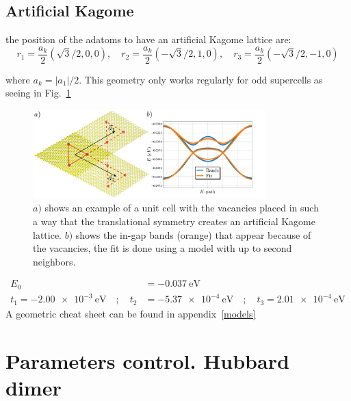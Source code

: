 \subsection{Artificial Kagome}
the position of the adatoms to have an artificial Kagome lattice are:
\begin{equation}
  r_1 = \frac{a_k}{2}\left(\sqrt{3}/2,  0 ,0\right),\quad
  r_2 = \frac{a_k}{2}\left(-\sqrt{3}/2,1,0\right),\quad
  r_3 = \frac{a_k}{2}\left(-\sqrt{3}/2,-1,0\right)
\end{equation}

where $a_k = |a_1|/2$. This geometry only works regularly for odd supercells as seeing in Fig.~\ref{kagome}


\begin{figure}[h!]
  \centering
  \includegraphics[width=0.8\textwidth]{artlat/fig/kagome_bands.pdf}
  \vspace{-5pt}
  \caption{$a)$ shows an example of a unit cell with the vacancies placed in such a way that the translational symmetry creates an artificial Kagome lattice. $b)$ shows the in-gap bands (orange) that appear because of the vacancies, the fit is done using a model with up to second neighbors.}
  \label{kagome}
\end{figure}
\FloatBarrier
\begin{equation}
\begin{split}
  E_0 &= \SI{-0.037}{\eV}\\
  t_1 = \SI{-2.00e-3}{\eV} \quad;\quad
  t_2 &= \SI{-5.37e-4}{\eV} \quad;\quad
  t_3 = \SI{2.01e-4}{\eV}
\end{split}
\end{equation}
A geometric cheat sheet can be found in appendix~\ref{models}





\section{Parameters control. Hubbard dimer}

